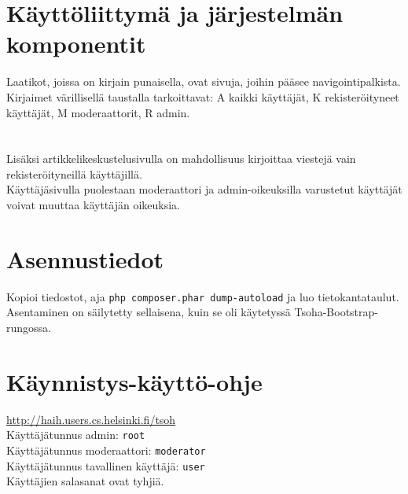 \documentclass[12pt]{article}
\begin{document}
  \section{Käyttöliittymä ja järjestelmän komponentit}
        Laatikot, joissa on kirjain punaisella, ovat sivuja, joihin pääsee navigointipalkista.
        Kirjaimet värillisellä taustalla tarkoittavat: A kaikki käyttäjät, K rekisteröityneet käyttäjät, M moderaattorit, R admin. \\
         \\ \\
        Lisäksi artikkelikeskustelusivulla on mahdollisuus kirjoittaa viestejä vain rekisteröityneillä käyttäjillä.\\
        Käyttäjäsivulla puolestaan moderaattori ja admin-oikeuksilla varustetut käyttäjät voivat muuttaa käyttäjän oikeuksia. \\
   \section{Asennustiedot}
        Kopioi tiedostot, aja \texttt{php composer.phar dump-autoload} ja luo tietokantataulut. Asentaminen on säilytetty sellaisena,
        kuin se oli käytetyssä Tsoha-Bootstrap-rungossa.
   \section{Käynnistys-käyttö-ohje}
        \url{http://haih.users.cs.helsinki.fi/tsoh} \\
        Käyttäjätunnus admin: \texttt{root} \\
        Käyttäjätunnus moderaattori: \texttt{moderator} \\
        Käyttäjätunnus tavallinen käyttäjä: \texttt{user} \\ 
        Käyttäjien salasanat ovat tyhjiä.
    
\end{document}
